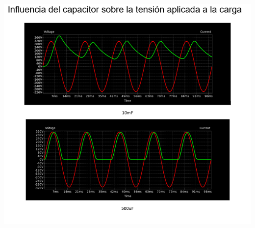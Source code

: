 \documentclass[12pt,a4paper]{article}
\begin{document}
\begin{center}
\includegraphics[scale=0.8]{imagenes/p2/caps/capfinal.PNG} 
\end{center}
\end{document}
